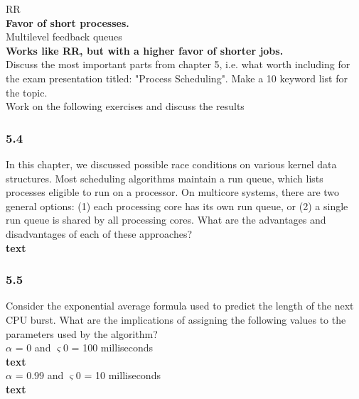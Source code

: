 \documentclass[a4paper,10pt,titlepage]{report}
\begin{document}
\hspace{10mm}RR\\
\hspace{20mm} \textbf{Favor of short processes.} \\


\hspace{10mm}Multilevel feedback queues\\
\hspace{20mm} \textbf{Works like RR, but with a higher favor of shorter jobs.} \\



\vspace{10mm}
Discuss the most important parts from chapter 5, i.e. what worth including for the exam presentation titled: "Process Scheduling". Make a 10 keyword list for the topic. \\
Work on the following exercises and discuss the results

\subsubsection{5.4}
In this chapter, we discussed possible race conditions on various kernel data structures. Most scheduling algorithms maintain a run queue, which lists processes eligible to run on a processor. On multicore systems, there are two general options: (1) each processing core has its own run queue, or (2) a single run queue is shared by all processing cores. What are the advantages and disadvantages of each of these approaches?\\
\hspace{20mm} \textbf{text} \\

\subsubsection{5.5}
Consider the exponential average formula used to predict the length of the next CPU burst. What are the implications of assigning the following values to the parameters used by the algorithm? \\
\hspace{10mm}$\alpha$ = 0 and $\varsigma 0$ = 100 milliseconds \\
\hspace{20mm} \textbf{text} \\


\hspace{10mm}$\alpha$ = 0.99 and $\varsigma 0$ = 10 milliseconds\\
\hspace{20mm} \textbf{text} \\
\end{document}
